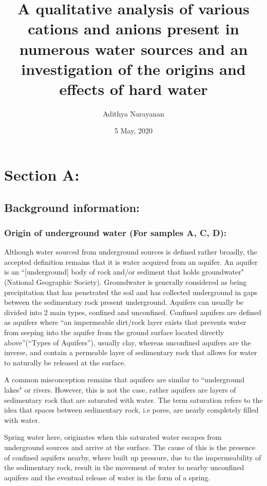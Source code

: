\documentclass[11pt, a4]{article}
\title{\vspace{90mm}A qualitative analysis of various cations and anions present in numerous water sources and an investigation of the origins and effects of hard water}
\author{Adithya Narayanan}
\date{5 May, 2020}
\begin{document}
	\begin{titlepage}
		\maketitle
		\thispagestyle{empty}
	\end{titlepage}
	\tableofcontents
	\thispagestyle{empty}
	\newpage
	\clearpage
	\setcounter{page}{1}
	\section{Section A:}
		\subsection{Background information:}
			\subsubsection{Origin of underground water (For samples A, C, D):}
				Although water sourced from underground sources is defined rather broadly, the accepted definition remains that it is water acquired from an aquifer. An aquifer is an ``[underground] body of rock and/or sediment that holds groundwater"(National Geographic Society). Groundwater is generally considered as being precipitation that has penetrated the soil and has collected underground in gaps between the sedimentary rock present underground. Aquifers can usually be divided into 2 main types, confined and unconfined. Confined aquifers are defined as aquifers where ``an impermeable dirt/rock layer exists that prevents water from seeping into the aquifer from the ground surface located directly above''(“Types of Aquifers”), usually clay, whereas unconfined aquifers are the inverse, and contain a permeable layer of sedimentary rock that allows for water to naturally be released at the surface. 

				A common misconception remains that aquifers are similar to ``underground lakes" or rivers. However, this is not the case, rather aquifers are layers of sedimentary rock that are saturated with water. The term saturation refers to the idea that spaces between sedimentary rock, i.e pores, are nearly completely filled with water.

				Spring water here, originates when this saturated water escapes from underground sources and arrive at the surface. The cause of this is the presence of confined aquifers nearby, where built up pressure, due to the impermeability of the sedimentary rock, result in the movement of water to nearby unconfined aquifers and the eventual release of water in the form of a spring.
			
\end{document}
